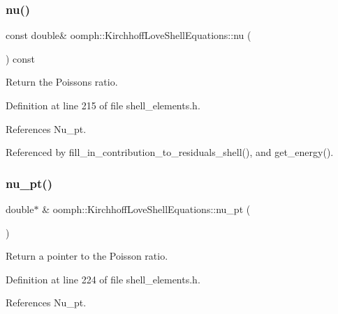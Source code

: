 \subsubsection{\texorpdfstring{nu()}{nu()}}
{\footnotesize\ttfamily const double\& oomph\+::\+Kirchhoff\+Love\+Shell\+Equations\+::nu (\begin{DoxyParamCaption}{ }\end{DoxyParamCaption}) const\hspace{0.3cm}{\ttfamily [inline]}}



Return the Poisson\textquotesingle{}s ratio. 



Definition at line 215 of file shell\+\_\+elements.\+h.



References Nu\+\_\+pt.



Referenced by fill\+\_\+in\+\_\+contribution\+\_\+to\+\_\+residuals\+\_\+shell(), and get\+\_\+energy().

\mbox{\label{classoomph_1_1KirchhoffLoveShellEquations_ab9bf30ac6d646fa1384a2ae7b8558ba0}} 
\subsubsection{\texorpdfstring{nu\+\_\+pt()}{nu\_pt()}}
{\footnotesize\ttfamily double$\ast$ \& oomph\+::\+Kirchhoff\+Love\+Shell\+Equations\+::nu\+\_\+pt (\begin{DoxyParamCaption}{ }\end{DoxyParamCaption})\hspace{0.3cm}{\ttfamily [inline]}}



Return a pointer to the Poisson ratio. 



Definition at line 224 of file shell\+\_\+elements.\+h.



References Nu\+\_\+pt.

\mbox{\label{classoomph_1_1KirchhoffLoveShellEquations_a78954c3bd74225e91c7433c0009860dc}} 
